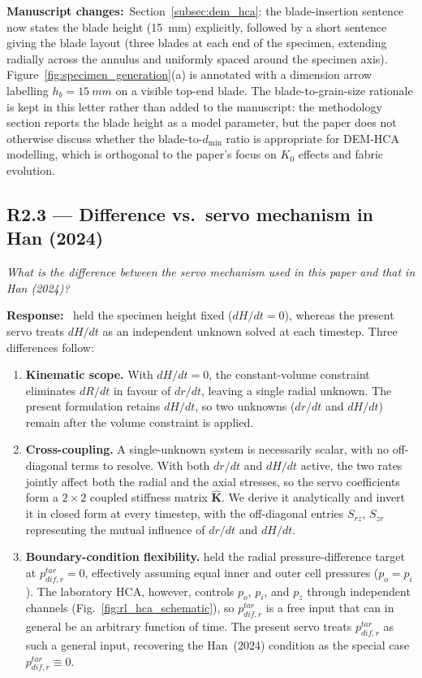 \documentclass[11pt,a4paper]{article}
\newenvironment{rcomment}
  {\begin{leftbar}\color{black!75}\itshape}
  {\end{leftbar}\vspace{0.3em}}
\newcommand{\response}{\par\noindent\textbf{Response:}\ \ignorespaces}
\newcommand{\changed}[1]{\par\noindent\textbf{Manuscript changes:}\ #1\par}
\begin{document}
\changed{Section~\ref{subsec:dem_hca}: the blade-insertion sentence
now states the blade height (\SI{15}{mm}) explicitly, followed by a
short sentence giving the blade layout (three blades at each end of
the specimen, extending radially across the annulus and uniformly
spaced around the specimen axis).  Figure~\ref{fig:specimen_generation}(a)
is annotated with a dimension arrow labelling $h_b=\SI{15}{mm}$ on a
visible top-end blade.  The blade-to-grain-size rationale
is kept in this letter rather than added to the manuscript: the
methodology section reports the blade height as a model parameter,
but the paper does not otherwise discuss whether the
blade-to-$d_{\min}$ ratio is appropriate for DEM-HCA modelling,
which is orthogonal to the paper's focus on $K_0$ effects and
fabric evolution.}

\subsection*{R2.3 --- Difference vs.\ servo mechanism in Han (2024)}

\begin{rcomment}
What is the difference between the servo mechanism used in this paper and
that in Han (2024)?
\end{rcomment}

\response
\citet{Han2024jgs} held the specimen height fixed ($dH/dt=0$),
whereas the present servo treats $dH/dt$ as an independent unknown
solved at each timestep. Three differences follow:
\begin{enumerate}[leftmargin=*,label=(\alph*),topsep=2pt,itemsep=3pt]
  \item \textbf{Kinematic scope.} With $dH/dt=0$, the
    constant-volume constraint eliminates $dR/dt$ in favour of
    $dr/dt$, leaving a single radial unknown. The present
    formulation retains $dH/dt$, so two unknowns ($dr/dt$ and
    $dH/dt$) remain after the volume constraint is applied.
  \item \textbf{Cross-coupling.} A single-unknown system is
    necessarily scalar, with no off-diagonal terms to resolve. With both $dr/dt$ and $dH/dt$ active, the two rates
    jointly affect both the radial and the axial stresses, so the
    servo coefficients form a $2\times 2$ coupled stiffness matrix
    $\hat{\mathbf{K}}$. We derive it analytically and invert it in
    closed form at every timestep, with the off-diagonal entries
    $S_{rz}$, $S_{zr}$ representing the mutual influence of $dr/dt$
    and $dH/dt$.
  \item \textbf{Boundary-condition flexibility.} \citet{Han2024jgs}
    held the radial pressure-difference target at
    $p_{dif,r}^{tar}=0$, effectively assuming equal inner and outer
    cell pressures ($p_o=p_i$). The laboratory HCA, however,
    controls $p_o$, $p_i$, and $p_z$ through independent channels
    (Fig.~\ref{fig:rl_hca_schematic}), so $p_{dif,r}^{tar}$ is a free
    input that can in general be an arbitrary function of time. The
    present servo treats $p_{dif,r}^{tar}$ as such a general input,
    recovering the Han~(2024) condition as the special case
    $p_{dif,r}^{tar}\equiv 0$.
\end{enumerate}
\end{document}
